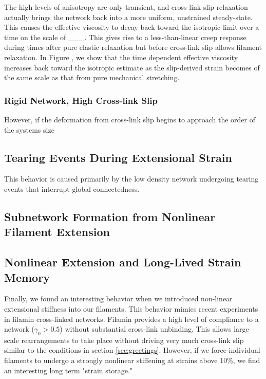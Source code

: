\documentclass[pre,preprint]{revtex4-1}
\begin{document}
The high levels of anisotropy are only transient, and cross-link slip relaxation actually brings the network back into a more uniform, unstrained steady-state.  This causes the effective viscosity to decay back toward the isotropic limit over a time on the scale of \_\_\_.  This gives rise to a less-than-linear creep response during times after pure elastic relaxation but before cross-link slip allows filament relaxation.  In Figure , we show that the time dependent effective viscosity increases back toward the isotropic estimate as the slip-derived strain becomes of the same scale as that from pure mechanical stretching.

\subsubsection{Rigid Network, High Cross-link Slip}

However, if the deformation from cross-link slip begins to approach the order of the systems size



\subsection{Tearing Events During Extensional Strain}

This behavior is caused primarily by the low density network undergoing tearing events that interrupt global connectedness.  

\subsection{Subnetwork Formation from Nonlinear Filament Extension}



\subsection{Nonlinear Extension and Long-Lived Strain Memory}
Finally, we found an interesting behavior when we introduced non-linear extensional stiffness into our filaments.  This behavior mimics recent experiments in filamin cross-linked networks.  Filamin provides a high level of compliance to a network ($\gamma_0>0.5$) without substantial cross-link unbinding.  This allows large scale rearrangements to take place without driving very much cross-link slip similar to the conditions in section \ref{sec:greetings}.  However, if we force individual filaments to undergo a strongly nonlinear stiffening at strains above 10\%, we find an interesting long term "strain storage."
\end{document}
